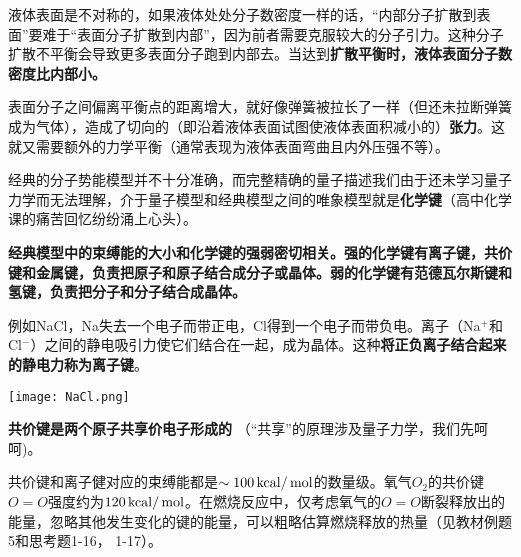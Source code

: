 \documentclass[CJK]{beamer}
\begin{document}
\begin{frame}
\bch
 液体表面是不对称的，如果液体处处分子数密度一样的话，“内部分子扩散到表面”要难于“表面分子扩散到内部”，因为前者需要克服较大的分子引力。这种分子扩散不平衡会导致更多表面分子跑到内部去。当达到{\bf 扩散平衡时，液体表面分子数密度比内部小。} 

\skipline

表面分子之间偏离平衡点的距离增大，就好像弹簧被拉长了一样（但还未拉断弹簧成为气体），造成了切向的（即沿着液体表面试图使液体表面积减小的）{\bf 张力}。这就又需要额外的力学平衡（通常表现为液体表面弯曲且内外压强不等）。

\ech
\end{frame}

\begin{frame}
\bch
经典的分子势能模型并不十分准确，而完整精确的量子描述我们由于还未学习量子力学而无法理解，介于量子模型和经典模型之间的唯象模型就是{\bf 化学键}（高中化学课的痛苦回忆纷纷涌上心头\wulian）。

\skipline

{\bf 经典模型中的束缚能的大小和化学键的强弱密切相关。强的化学键有离子键，共价键和金属键，负责把原子和原子结合成分子或晶体。弱的化学键有范德瓦尔斯键和氢键，负责把分子和分子结合成晶体。}
\ech
\end{frame}

\begin{frame}
\bch

例如NaCl，Na失去一个电子而带正电，Cl得到一个电子而带负电。离子（Na$^+$和Cl$^{-}$）之间的静电吸引力使它们结合在一起，成为晶体。这种{\bf 将正负离子结合起来的静电力称为离子键}。

\skipline

\bcenter
\texttt{[image: NaCl.png]}
\ecenter

\ech
\end{frame}

\begin{frame}
\bch

{\bf 共价键是两个原子共享价电子形成的} （“共享”的原理涉及量子力学，我们先呵呵\bye)。

\skiplines

共价键和离子健对应的束缚能都是$\sim 100 \,\mathrm{kcal}/\,\mathrm{mol}$的数量级。氧气$O_2$的共价键$O=O$强度约为$120 \,\mathrm{kcal}/\,\mathrm{mol}$。在燃烧反应中，仅考虑氧气的$O=O$断裂释放出的能量，忽略其他发生变化的键的能量，可以粗略估算燃烧释放的热量（见教材例题5和思考题1-16， 1-17）。
\ech
\end{frame}
\end{document}
